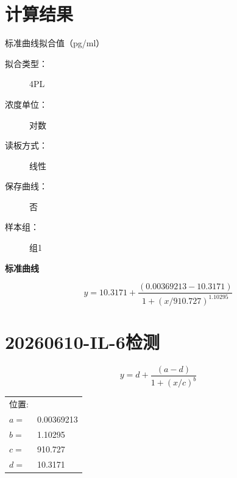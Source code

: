 \documentclass[UTF8,10pt,a4paper,fontset=fandol]{ctexart}
\newcommand{\fieldvalue}[1]{#1}
\begin{document}
\section*{计算结果}

标准曲线拟合值（pg/ml）

\begin{description}
\item[拟合类型：]
\fieldvalue{4PL}

\item[浓度单位：]
\fieldvalue{对数}

\item[读板方式：]
\fieldvalue{线性}

\item[保存曲线：]
\fieldvalue{否}

\item[样本组：]
\fieldvalue{组1}
\end{description}

\begin{center}
\textbf{标准曲线}

\end{center}

\[
y=10.3171+
\frac{(0.00369213-10.3171)}
 {1+\left(x/910.727\right)^{1.10295}}
\]

\newpage

\section{20260610-IL-6检测}

\[
y=d+\frac{(a-d)}{1+(x/c)^b}
\]

\begin{tabular}{@{}ll@{}}
位置: & \\
$a=$ & 0.00369213\\
$b=$ & 1.10295\\
$c=$ & 910.727\\
$d=$ & 10.3171\\
\end{tabular}
\end{document}
